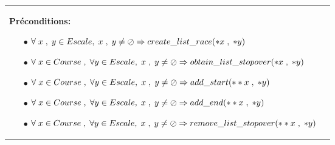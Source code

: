 \documentclass[a4paper, 11pt, oneside]{article}
\begin{document}
\begin{tabular}{|p{17cm}|c}
				\textbf{Préconditions:}
					\begin{itemize}
						\item[$\bullet$] $\forall \hspace{1mm} x \hspace{1mm} , \hspace{1mm} y \in Escale, \hspace{1mm} x \hspace{1mm} , \hspace{1mm} y  \neq \oslash \Rightarrow create\_list\_race(*x \hspace{1mm} , \hspace{1mm}*y)$
						\item[$\bullet$] $\forall \hspace{1mm} x \in Course \hspace{1mm},\hspace{1mm} \forall y \in Escale, \hspace{1mm} x \hspace{1mm} , \hspace{1mm} y  \neq \oslash  \Rightarrow  obtain\_list\_stopover(*x \hspace{1mm} , \hspace{1mm }*y)$
						\item[$\bullet$] $\forall \hspace{1mm} x \in Course \hspace{1mm},\hspace{1mm} \forall y \in Escale, \hspace{1mm} x \hspace{1mm} , \hspace{1mm} y  \neq \oslash  \Rightarrow  add\_start(**x \hspace{1mm} , \hspace{1mm} *y)$						
						\item[$\bullet$] $\forall \hspace{1mm} x \in Course \hspace{1mm},\hspace{1mm} \forall y \in Escale, \hspace{1mm} x \hspace{1mm} , \hspace{1mm} y  \neq \oslash  \Rightarrow  add\_end(**x \hspace{1mm} , \hspace{1mm} *y)$						
						\item[$\bullet$] $\forall \hspace{1mm} x \in Course \hspace{1mm},\hspace{1mm} \forall y \in Escale, \hspace{1mm} x \hspace{1mm} , \hspace{1mm} y  \neq \oslash  \Rightarrow  remove\_list\_stopover(**x \hspace{1mm} ,\hspace{1mm} *y)$	

\end{itemize}
\end{tabular}
\end{document}
